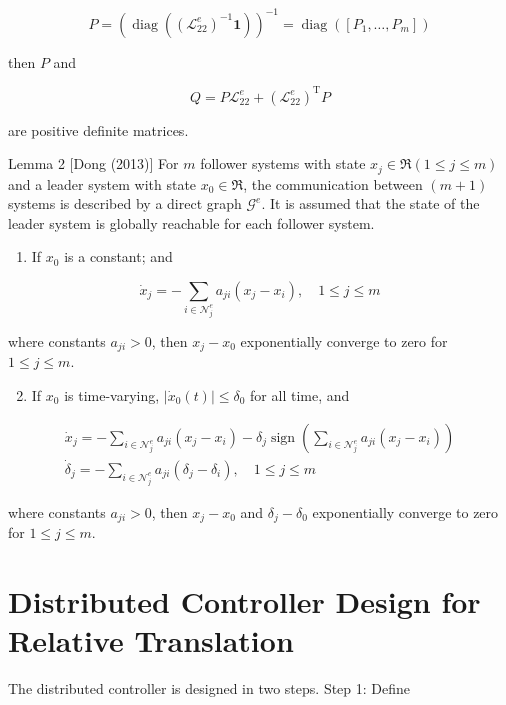 \documentclass[10pt]{article}
\begin{document}
$$
P=\left(\operatorname{diag}\left(\left(\mathcal{L}_{22}^{e}\right)^{-1} \mathbf{1}\right)\right)^{-1}=\operatorname{diag}\left(\left[P_{1}, \ldots, P_{m}\right]\right)
$$

then $P$ and

$$
Q=P \mathcal{L}_{22}^{e}+\left(\mathcal{L}_{22}^{e}\right)^{\mathrm{T}} P
$$

are positive definite matrices.

Lemma 2 [Dong (2013)] For $m$ follower systems with state $x_{j} \in \Re(1 \leq j \leq m)$ and a leader system with state $x_{0} \in \Re$, the communication between $(m+1)$ systems is described by a direct graph $\mathcal{G}^{e}$. It is assumed that the state of the leader system is globally reachable for each follower system.

\begin{enumerate}
  \item If $x_{0}$ is a constant; and
\end{enumerate}

$$
\dot{x}_{j}=-\sum_{i \in \mathcal{N}_{j}^{e}} a_{j i}\left(x_{j}-x_{i}\right), \quad 1 \leq j \leq m
$$

where constants $a_{j i}>0$, then $x_{j}-x_{0}$ exponentially converge to zero for $1 \leq j \leq m$.

\begin{enumerate}
  \setcounter{enumi}{1}
  \item If $x_{0}$ is time-varying, $\left|\dot{x}_{0}(t)\right| \leq \delta_{0}$ for all time, and
\end{enumerate}

$$
\begin{gathered}
\dot{x}_{j}=-\sum_{i \in \mathcal{N}_{j}^{e}} a_{j i}\left(x_{j}-x_{i}\right)-\delta_{j} \operatorname{sign}\left(\sum_{i \in \mathcal{N}_{j}^{e}} a_{j i}\left(x_{j}-x_{i}\right)\right) \\
\dot{\delta}_{j}=-\sum_{i \in \mathcal{N}_{j}^{e}} a_{j i}\left(\delta_{j}-\delta_{i}\right), \quad 1 \leq j \leq m
\end{gathered}
$$

where constants $a_{j i}>0$, then $x_{j}-x_{0}$ and $\delta_{j}-\delta_{0}$ exponentially converge to zero for $1 \leq j \leq m$.

\section{Distributed Controller Design for Relative Translation}
The distributed controller is designed in two steps. Step 1: Define
\end{document}

